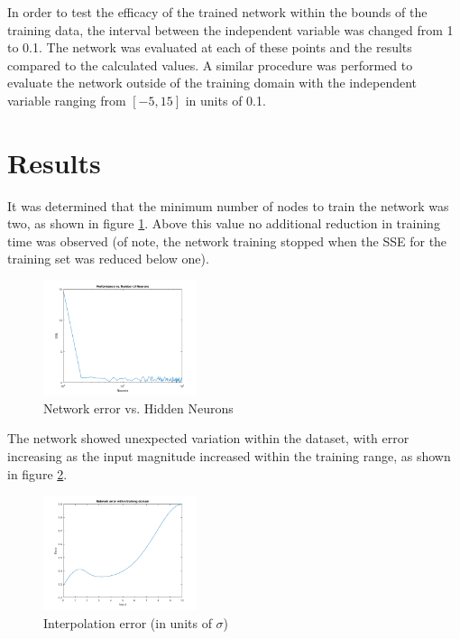 \documentclass{IEEEtran}
\begin{document}
In order to test the efficacy of the trained network within the bounds of the training data, the interval between the independent variable was changed from 1 to 0.1. The network was evaluated at each of these points and the results compared to the calculated values. A similar procedure was performed to evaluate the network outside of the training domain with the independent variable ranging from $\left[-5,15\right]$ in units of 0.1.

\section{Results}
It was determined that the minimum number of nodes to train the network was two, as shown in figure \ref{fig:trainperf}. Above this value no additional reduction in training time was observed (of note, the network training stopped when the SSE for the training set was reduced below one).

\begin{centering}
\begin{figure}
\begin{center}
	\includegraphics[width=0.4\textwidth]{fit_vs_neurons}
	\caption{Network error vs. Hidden Neurons\label{fig:trainperf}}
\end{center}
\end{figure}
\end{centering}

The network showed unexpected variation within the dataset, with error increasing as the input magnitude increased within the training range, as shown in figure \ref{fig:interp_error}.

\begin{centering}
\begin{figure}
\begin{center}
	\includegraphics[width=0.4\textwidth]{interp_error}
	\caption{Interpolation error (in units of $\sigma$) \label{fig:interp_error}}
\end{center}
\end{figure}
\end{centering}
\end{document}
